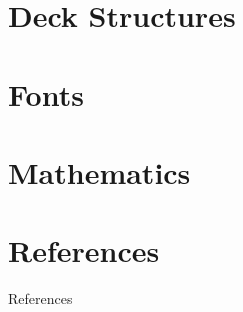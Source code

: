 \documentclass[aspectratio=169, sectionpages, codemintedoverleaf, bibref]{beamer}
\begin{document}
\section{Deck Structures}










\section{Fonts}



\section{Mathematics}









\section{References}

\begin{frame}[allowframebreaks]{References}
	\printbibliography[title={References}]%
\end{frame}
\end{document}
